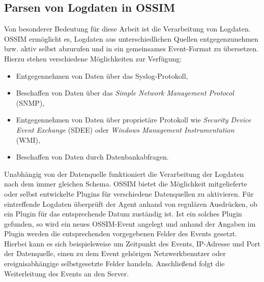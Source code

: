 \subsection{Parsen von Logdaten in OSSIM}

\label{subsec_state_siem_parsing}

Von besonderer Bedeutung für diese Arbeit ist die Verarbeitung von Logdaten. OSSIM ermöglicht es, Logdaten aus unterschiedlichen Quellen entgegenzunehmen bzw. aktiv selbst abzurufen und in ein gemeinsames Event-Format zu übersetzen.\\
Hierzu stehen verschiedene Möglichkeiten zur Verfügung:

\begin{itemize}
  \item Entgegennehmen von Daten über das Syslog-Protokoll,
  \item Beschaffen von Daten über das \textit{Simple Network Management Protocol} (SNMP),
  \item Entgegennehmen von Daten über proprietäre Protokoll wie \textit{Security Device Event Exchange} (SDEE) oder \textit{Windows Management Instrumentation} (WMI),
  \item Beschaffen von Daten durch Datenbankabfragen. 
\end{itemize}

Unabhängig von der Datenquelle funktioniert die Verarbeitung der Logdaten nach dem immer gleichen Schema. OSSIM bietet die Möglichkeit mitgelieferte oder selbst entwickelte Plugins für verschiedene Datenquellen zu aktivieren. Für eintreffende Logdaten überprüft der Agent anhand von regulären Ausdrücken, ob ein Plugin für das entsprechende Datum zuständig ist. Ist ein solches Plugin gefunden, so wird ein neues OSSIM-Event angelegt und anhand der Angaben im Plugin werden die entsprechenden vorgegebenen Felder des Events gesetzt. Hierbei kann es sich beispielsweise um Zeitpunkt des Events, IP-Adresse und Port der Datenquelle, einen zu dem Event gehörigen Netzwerkbenutzer oder ereignisabhängige selbstgesetzte Felder handeln. Anschließend folgt die Weiterleitung des Events an den Server.
